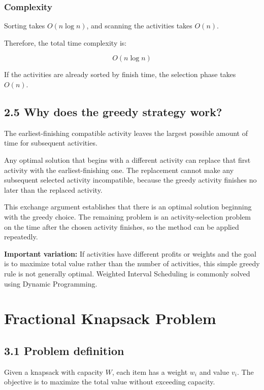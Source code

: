 \subsubsection{Complexity}

Sorting takes $O(n\log n)$, and scanning the activities takes $O(n)$.

Therefore, the total time complexity is:


\[
\boxed{O(n\log n)}
\]


If the activities are already sorted by finish time, the selection phase takes $O(n)$.

\subsection{2.5 Why does the greedy strategy work?}

The earliest-finishing compatible activity leaves the largest possible amount of time for subsequent activities.

Any optimal solution that begins with a different activity can replace that first activity with the earliest-finishing one. The replacement cannot make any subsequent selected activity incompatible, because the greedy activity finishes no later than the replaced activity.

This exchange argument establishes that there is an optimal solution beginning with the greedy choice. The remaining problem is an activity-selection problem on the time after the chosen activity finishes, so the method can be applied repeatedly.

\textbf{Important variation:} If activities have different profits or weights and the goal is to maximize total value rather than the number of activities, this simple greedy rule is not generally optimal. Weighted Interval Scheduling is commonly solved using Dynamic Programming.

\section{Fractional Knapsack Problem}

\subsection{3.1 Problem definition}

Given a knapsack with capacity $W$, each item has a weight $w_i$ and value $v_i$. The objective is to maximize the total value without exceeding capacity.

